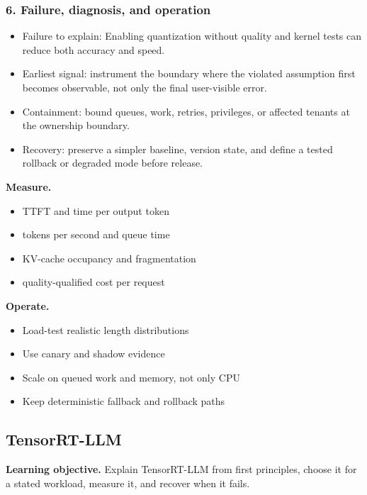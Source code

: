 \subsubsection*{6. Failure, diagnosis, and operation}
\begin{itemize}
\item Failure to explain: Enabling quantization without quality and kernel tests can reduce both accuracy and speed.
\item Earliest signal: instrument the boundary where the violated assumption first becomes observable, not only the final user-visible error.
\item Containment: bound queues, work, retries, privileges, or affected tenants at the ownership boundary.
\item Recovery: preserve a simpler baseline, version state, and define a tested rollback or degraded mode before release.
\end{itemize}
\textbf{Measure.}\begin{itemize}
\item TTFT and time per output token
\item tokens per second and queue time
\item KV-cache occupancy and fragmentation
\item quality-qualified cost per request
\end{itemize}
\textbf{Operate.}\begin{itemize}
\item Load-test realistic length distributions
\item Use canary and shadow evidence
\item Scale on queued work and memory, not only CPU
\item Keep deterministic fallback and rollback paths
\end{itemize}
\subsection{TensorRT-LLM}
\textbf{Learning objective.} Explain TensorRT-LLM from first principles, choose it for a stated workload, measure it, and recover when it fails.
